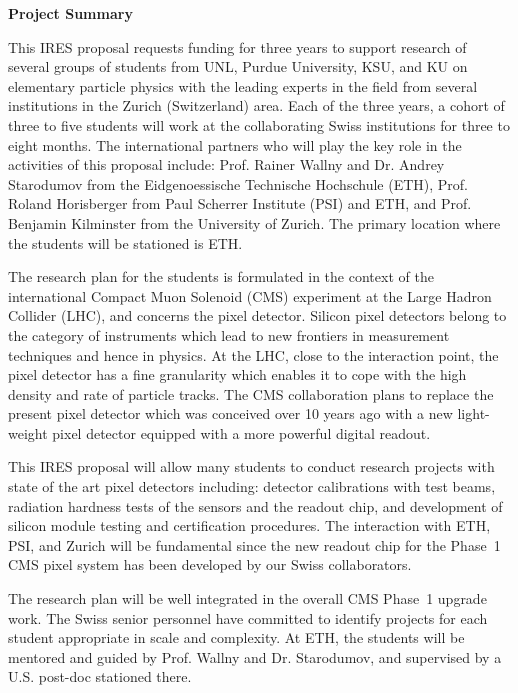 \documentclass[12pt]{article}
\begin{document}
\pagestyle{empty}

\begin{center}
{\large\bf Project Summary}
\end{center}

This IRES proposal requests funding for three years to support
research of several groups of students from UNL, Purdue University,
KSU, and KU on elementary particle physics with the leading experts in
the field from several institutions in the Zurich (Switzerland)
area. Each of the three years, a cohort of three to five students will
work at the collaborating Swiss institutions for three to eight
months. The international partners who will play the key role in the
activities of this proposal include: Prof. Rainer Wallny and
Dr. Andrey Starodumov from the Eidgenoessische Technische Hochschule
(ETH), Prof. Roland Horisberger from Paul Scherrer Institute (PSI) and
ETH, and Prof. Benjamin Kilminster from the University of Zurich. The
primary location where the students will be stationed is ETH.

The research plan for the students is formulated in the context of the
international Compact Muon Solenoid (CMS) experiment at the Large
Hadron Collider (LHC), and concerns the pixel detector. Silicon pixel
detectors belong to the category of instruments which lead to new
frontiers in measurement techniques and hence in physics. At the LHC,
close to the interaction point, the pixel detector has a fine
granularity which enables it to cope with the high density and rate of
particle tracks. The CMS collaboration plans to replace the present
pixel detector which was conceived over 10 years ago with a new
light-weight pixel detector equipped with a more powerful digital
readout.

This IRES proposal will allow many students to conduct research
projects with state of the art pixel detectors including: detector
calibrations with test beams, radiation hardness tests of the sensors
and the readout chip, and development of silicon module testing and
certification procedures. The interaction with ETH, PSI, and Zurich
will be fundamental since the new readout chip for the Phase~1 CMS
pixel system has been developed by our Swiss collaborators.

The research plan will be well integrated in the overall CMS Phase~1
upgrade work. The Swiss senior personnel have committed to identify
projects for each student appropriate in scale and complexity. At ETH,
the students will be mentored and guided by Prof. Wallny and
Dr. Starodumov, and supervised by a U.S. post-doc stationed there.
\end{document}
